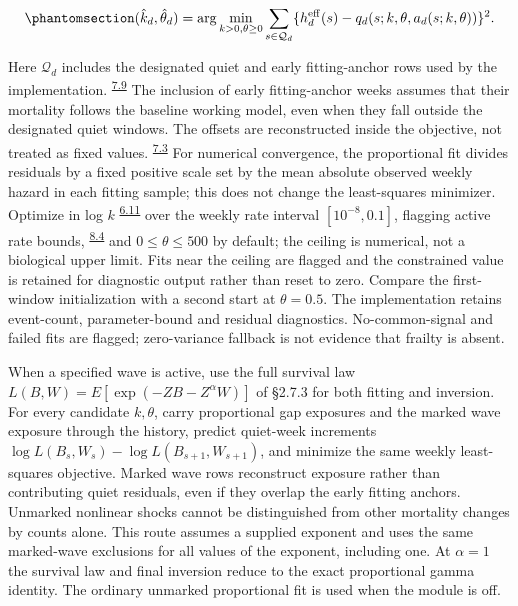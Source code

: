 \documentclass[
]{article}
\DeclareRobustCommand{\oldword}[1]{\leavevmode{\setbox0=\hbox{#1}\rlap{\raisebox{.5ex}{\rule{\wd0}{.45pt}}}\box0\relax}}
\begin{document}
\begin{equation}\protect\phantomsection\label{eq:nls-objective}{(\hat k_d,\hat\theta_d)=\arg\min_{k>0,\theta\ge0}
\sum_{s\in\mathcal Q_d}\{h_d^{\rm eff}(s)-q_d(s;k,\theta,a_d(s;k,\theta))\}^2 .}\end{equation}

Here \(\mathcal Q_d\) includes the designated quiet and early fitting-anchor rows used by the implementation. \textsuperscript{\hyperlink{issue-7.9}{7.9}} {\color{red} The inclusion of early fitting-anchor weeks assumes that their mortality follows the baseline working model, even when they fall outside the designated quiet windows.} The offsets are reconstructed inside the objective, not treated as fixed values. \textsuperscript{\hyperlink{issue-7.3}{7.3}} {\color{red} For numerical convergence, the proportional fit divides residuals by a fixed positive scale set by the mean absolute observed weekly hazard in each fitting sample; this does not change the least-squares minimizer.} Optimize in log \(k\) \textsuperscript{\hyperlink{issue-6.11}{6.11}}  {\color{red}over the weekly rate interval \([10^{-8},0.1]\), flagging active rate bounds,} \textsuperscript{\hyperlink{issue-8.4}{8.4}} \oldword{and} \oldword{nonnegative} \oldword{\(\theta\)} \oldword{;} \oldword{compare} {\color{red} and \(0\le\theta\le500\) by default; the ceiling is numerical, not a biological upper limit. Fits near the ceiling are flagged and the constrained value is retained for diagnostic output rather than reset to zero. Compare} the first-window initialization with a second start at \(\theta=0.5\). The implementation retains event-count, parameter-bound and residual diagnostics. No-common-signal and failed fits are flagged; zero-variance fallback is not evidence that frailty is absent.

When a specified wave is active, use the full survival law \(L(B,W)=E[\exp(-ZB-Z^\alpha W)]\) of §2.7.3 for both fitting and inversion. For every candidate \(k,\theta\), carry proportional gap exposures and the marked wave exposure through the history, predict quiet-week increments \(\log L(B_s,W_s)-\log L(B_{s+1},W_{s+1})\), and minimize the same weekly least-squares objective. Marked wave rows reconstruct exposure rather than contributing quiet residuals, even if they overlap the early fitting anchors. Unmarked nonlinear shocks cannot be distinguished from other mortality changes by counts alone. This route assumes a supplied exponent and uses the same marked-wave exclusions for all values of the exponent, including one. At \(\alpha=1\) the survival law and final inversion reduce to the exact proportional gamma identity. The ordinary unmarked proportional fit is used when the module is off.
\end{document}
